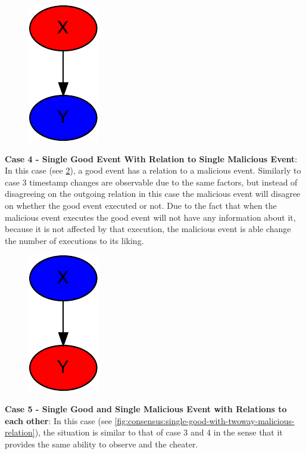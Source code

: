 	\begin{figure}[H]
		\centering
		\includegraphics[]{5validation/images/3.pdf}
		\caption{}
		\label{fig:consensus:single-malicious-with-good-relation}
	\end{figure}
	
	\newpar \textbf{Case 4 - Single Good Event With Relation to Single Malicious Event}: In this case (see \ref{fig:consensus:single-good-with-malicious-relation}), a good event has a relation to a malicious event. Similarly to case 3 timestamp changes are observable due to the same factors, but instead of disagreeing on the outgoing relation in this case the malicious event will disagree on whether the good event executed or not. Due to the fact that when the malicious event executes the good event will not have any information about it, because it is not affected by that execution, the malicious event is able change the number of executions to its liking.
	 
	\begin{figure}[H]
		\centering
		\includegraphics[]{5validation/images/2.pdf}
		\caption{}
		\label{fig:consensus:single-good-with-malicious-relation}
	\end{figure}
	
	\newpar \textbf{Case 5 - Single Good and Single Malicious Event with Relations to each other}: In this case (see \ref{fig:consensus:single-good-with-twoway-malicious-relation}), the situation is similar to that of case 3 and 4 in the sense that it provides the same ability to observe and the cheater.
	
